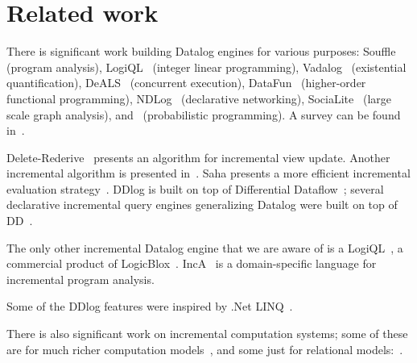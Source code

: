 \section{Related work}

There is significant work building Datalog engines for various
purposes: Souffle~\cite{scholz-cc16} (program analysis),
LogiQL~\cite{Borraz-Sanchez-dlp18} (integer linear programming),
Vadalog~\cite{Bellomarini-vldb18} (existential quantification),
DeALS~\cite{Yang-vldb17} (concurrent execution),
DataFun~\cite{Arntzenius-icfp16} (higher-order functional
programming), NDLog~\cite{loo-cacm09} (declarative networking),
SociaLite~\cite{Seo-vldb13} (large scale graph analysis),
and~\cite{Barany-tods17} (probabilistic programming).  A survey can be
found in~\cite{Maier-book18}.

Delete-Rederive~\cite{Gupta-sigmod93} presents an algorithm for
incremental view update.  Another incremental algorithm is presented
in~\cite{dong-dbpl94}.  Saha presents a more efficient incremental
evaluation strategy~\cite{saha-iclp03}.  DDlog is built on top of
Differential Dataflow~\cite{differential-dataflow}; several
declarative incremental query engines generalizing Datalog were built
on top of DD~\cite{timely-dataflow,differential-dataflow-paper}.

The only other incremental Datalog engine
that we are aware of is a LogiQL~\cite{Green-pods15}, a commercial
product of LogicBlox~\cite{Aref-sigmod15}.  IncA~\cite{IncA} is a
domain-specific language for incremental program analysis.

Some of the DDlog features were inspired by .Net
LINQ~\cite{meijer-dpcool03,Meijer-sigmod06}.

There is also significant work on incremental computation systems;
some of these are for much richer computation
models~\cite{acar-05,Carlsson-icfp02,Demetrescu-oopsla11,harkes-ecoop16,Hammer-pldi14},
and some just for relational
models:~\cite{ahmad-vldb12,Szabo-ase016,zhao-icmd17}.
